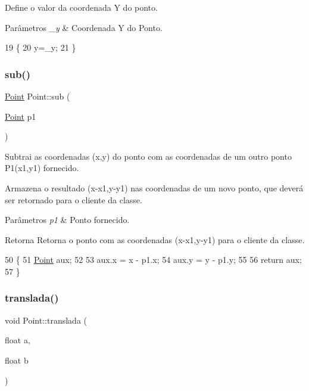 Define o valor da coordenada Y do ponto. 


\begin{DoxyParams}{Parâmetros}
{\em \+\_\+y} & Coordenada Y do Ponto. \\
\hline
\end{DoxyParams}

\begin{DoxyCode}
19 \{
20     y=\_y;
21 \}
\end{DoxyCode}
\mbox{\label{class_point_a9cf2c53b0a4e6282a6712824bb4e9b00}} 
\subsubsection{\texorpdfstring{sub()}{sub()}}
{\footnotesize\ttfamily \mbox{\hyperlink{class_point}{Point}} Point\+::sub (\begin{DoxyParamCaption}\item[{\mbox{\hyperlink{class_point}{Point}}}]{p1 }\end{DoxyParamCaption})}



Subtrai as coordenadas (x,y) do ponto com as coordenadas de um outro ponto P1(x1,y1) fornecido. 

Armazena o resultado (x-\/x1,y-\/y1) nas coordenadas de um novo ponto, que deverá ser retornado para o cliente da classe. 
\begin{DoxyParams}{Parâmetros}
{\em p1} & Ponto fornecido. \\
\hline
\end{DoxyParams}
\begin{DoxyReturn}{Retorna}
Retorna o ponto com as coordenadas (x-\/x1,y-\/y1) para o cliente da classe. 
\end{DoxyReturn}

\begin{DoxyCode}
50 \{
51     \mbox{\hyperlink{class_point}{Point}} aux;
52 
53     aux.x = x - p1.x;
54     aux.y = y - p1.y;
55 
56     \textcolor{keywordflow}{return} aux;
57 \}
\end{DoxyCode}
\mbox{\label{class_point_ad9676e36f3444534b609e3c68422239a}} 
\subsubsection{\texorpdfstring{translada()}{translada()}}
{\footnotesize\ttfamily void Point\+::translada (\begin{DoxyParamCaption}\item[{float}]{a,  }\item[{float}]{b }\end{DoxyParamCaption})}



